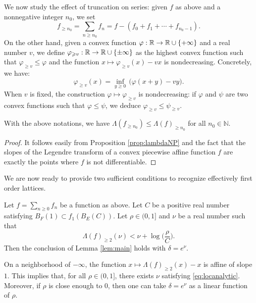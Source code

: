 \documentclass{lms}
\begin{document}
We now study the effect of truncation on series: given $f$ as above
and a nonnegative integer $n_0$, we set
\[
f_{\geq n_0} = \sum_{n \geq n_0} f_n = f - (f_0 + f_1 + \cdots +
f_{n_0 - 1}).
\]
On the other hand, given a convex function $\varphi : \mathbb R \to \mathbb R \cup
\{+\infty\}$ and a real number $v$, we define $\varphi_{\geqslant v} : \mathbb R \to 
\mathbb R \cup \{\pm \infty\}$ as the highest convex function such that 
$\varphi_{\geq v} \leq \varphi$ and the function $x \mapsto 
\varphi_{\geq v}(x) - v x$ is nondecreasing. Concretely, we have:
$$\varphi_{\geq v}(x) = \inf_{y \geq 0} \, \big(\varphi(x + y) - v y 
\big).$$
When $v$ is fixed, the construction $\varphi \mapsto \varphi_{\geq v}$
is nondecreasing: if $\varphi$ and $\psi$ are two convex functions such
that $\varphi \leq \psi$, we deduce $\varphi_{\geq v} \leq \psi_{\geq v}$.

\begin{prop} \label{prop:trunc}
With the above notations, we have $\Lambda(f_{\geq n_0}) \leq
\Lambda(f)_{\geq n_0}$ for all $n_0 \in \mathbb N$.
\end{prop}

\begin{proof}
It follows easily from Proposition \ref{prop:lambdaNP} and the fact that 
the slopes of the Legendre transform of a convex piecewise affine 
function $f$ are exactly the points where $f$ is not differentiable.
\end{proof}

We are now ready to provide two sufficient conditions to recognize 
effectively first order lattices.

\begin{prop}
\label{prop:locanalytic}
Let $f = \sum_{n \geq 0} f_n$ be a function as above.
Let $C$ be a positive real number satisfying 
$B_F(1) \subset f_1(B_E(C))$.
Let $\rho \in (0, 1]$ and $\nu$ be a real number such that 
\begin{equation}
\label{eq:locanalytic}
\Lambda(f)_{\geq 2} (\nu) < \nu + \log \Big( \frac \rho C \Big).
\end{equation}
Then the conclusion of Lemma \ref{lem:main} holds with $\delta = e^\nu$.
\end{prop}

\begin{rem}
On a neighborhood of $-\infty$, the function $x \mapsto \Lambda(f)_{\geq 
2} (x) - x$ is affine of slope $1$. This implies that, for all $\rho \in
(0,1]$, there exists $\nu$ satisfying \eqref{eq:locanalytic}. Moreover,
if $\rho$ is close enough to $0$, then one can take $\delta = e^\nu$ as a 
linear function of $\rho$.
\end{rem}
\end{document}
